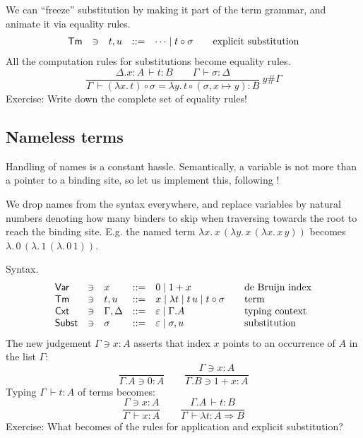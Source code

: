 \documentclass[a4paper,fleqn]{scrartcl}
\newcommand{\comp}{\circ}
\newcommand{\To}{\Rightarrow}
\newcommand{\der}{\,\vdash}
\newcommand{\ru}[2]{\dfrac{#1}{#2}}
\newcommand{\rux}[3]{\ru{#1}{#2}\ #3}
\newcommand{\Var}{\mathsf{Var}}
\newcommand{\Tm}{\mathsf{Tm}}
\newcommand{\Cxt}{\mathsf{Cxt}}
\newcommand{\Subst}{\mathsf{Subst}}
\newcommand{\Gs}{\ensuremath{\sigma}}
\begin{document}
We can ``freeze'' substitution by making it part of the term grammar,
and animate it via equality rules.
\[
\begin{array}{lllrl@{\qquad}l}
\Tm & \ni & t,u & ::= & \dots \mid t \comp \Gs
  & \mbox{explicit substitution} \\
\end{array}
\]
All the computation rules for substitutions become equality rules.
\[
\rux{\Delta.x{:}A \der t : B \qquad \Gamma \der \Gs : \Delta
   }{\Gamma \der (\lambda x.\,t) \comp \Gs
              = \lambda y.\,t \comp (\Gs,x{\mapsto}y) : B
   }{y \# \Gamma}
\]
Exercise: Write down the complete set of equality rules!

\subsection{Nameless terms}

Handling of names is a constant hassle.  Semantically, a variable is
not more than a pointer to a binding site, so let us implement this,
following \textcite{Bruijn72}!

We drop names from the syntax everywhere, and replace variables by
natural numbers denoting how many binders to skip when traversing
towards the root to reach the binding site.  E.g. the named term
$\lambda x.\,x\,(\lambda y.\,x\,(\lambda x.\,x\,y))$ becomes
$\lambda.\,0\,(\lambda.\,1\,(\lambda.\,0\,1))$.

Syntax.
\[
\begin{array}{lllrl@{\qquad}l}
\Var & \ni & x & ::= & 0 \mid 1 + x & \mbox{de Bruijn index} \\
\Tm & \ni & t,u & ::= & x \mid \lambda t \mid t \, u \mid t \comp \Gs & \mbox{term}
  \\
\Cxt & \ni & \Gamma,\Delta & ::= & \varepsilon \mid \Gamma.A
  & \mbox{typing context}\\
\Subst & \ni & \sigma & ::= & \varepsilon \mid \sigma,u
  & \mbox{substitution} \\
\end{array}
\]
The new judgement $\Gamma \ni x : A$ asserts that index $x$ points to an occurrence of $A$ in the list $\Gamma$:
\[
  \ru{}{\Gamma.A \ni 0 : A}
\qquad
  \ru{\Gamma \ni x : A}{\Gamma.B \ni 1 + x : A}
\]
Typing $\Gamma \der t : A$ of terms becomes:
\[
  \ru{\Gamma \ni x : A}{\Gamma \der x : A}
\qquad
  \ru{\Gamma.A \der t : B
    }{\Gamma \der \lambda t : A \To B}
\]
Exercise: What becomes of the rules for application and explicit substitution?
\end{document}
